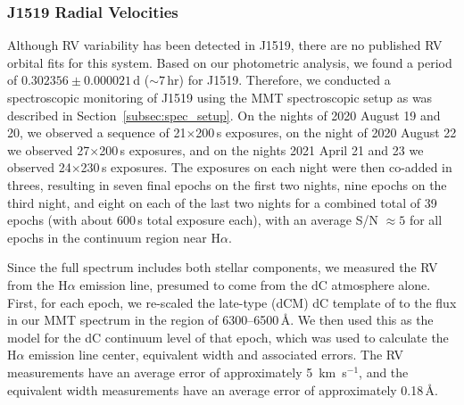 \documentclass[twocolumn]{aastex631}
\begin{document}
\subsubsection{J1519 Radial Velocities}\label{subsec:J1519_mmtrvs}

Although RV variability has been detected in J1519, there are no published RV orbital fits for this system. Based on our photometric analysis, we found a period of $0.302356\pm0.000021$\,d ($\sim 7$\,hr) for J1519. Therefore, we conducted a spectroscopic monitoring of J1519 using the MMT spectroscopic setup as  was described in Section~\ref{subsec:spec_setup}. On the nights of 2020 August 19 and 20, we observed a sequence of 21$\times$200\,s exposures, on the night of 2020 August 22 we observed 27$\times$200\,s exposures, and on the nights 2021 April 21 and 23 we observed 24$\times$230\,s exposures. The exposures on each night were then co-added in threes, resulting in seven final epochs on the first two nights, nine epochs on the third night, and eight on each of the last two nights for a combined total of 39 epochs (with about 600\,s total exposure each), with an average S/N $\approx 5$ for all epochs in the continuum region near H$\alpha$. 

Since the full spectrum includes both stellar components, we measured the RV from the H$\alpha$ emission line, presumed to come from the dC atmosphere alone. First, for each epoch, we re-scaled the late-type (dCM) dC template of \citet{Roulston2020} to the flux in our MMT spectrum in the region of 6300--6500\,\AA. We then used this as the model for the dC continuum level of that epoch, which was used to calculate the H$\alpha$ emission line center, equivalent width and associated errors. The RV measurements have an average error of approximately 5~km~s$^{-1}$, and the equivalent width  measurements have an average error of approximately 0.18\,\AA.
\end{document}
